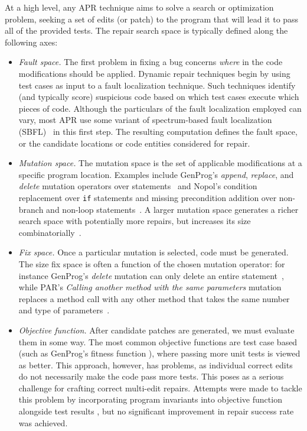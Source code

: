 \documentclass[sigconf, timestamp-false, anonymous=true]{acmart}
\begin{document}
At a high level, any APR technique aims to solve a search or optimization
problem, seeking a set of edits (or patch) to the program that will lead it to
pass all of the provided tests. The repair search space is typically defined
along the following axes:
\begin{itemize}

\item \emph{Fault space.} The first problem in fixing a bug concerns
  \emph{where} in the code modifications should be applied. Dynamic repair
  techniques begin by using test cases as input to a fault localization
  technique. Such techniques identify (and typically score) suspicious code
  based on which test cases execute which pieces of code. Although the
  particulars of the fault localization employed can vary, most APR use some
  variant of spectrum-based fault localization (SBFL)~\cite{ochiai} in this first
  step. The resulting computation defines the fault space, or the candidate
  locations or code entities considered for repair.

\item \emph{Mutation space.} The mutation space is the set of applicable
  modifications at a specific program location. Examples include GenProg's
  \emph{append}, \emph{replace}, and \emph{delete} mutation operators over
  statements~\cite{genprog-operators} and Nopol's condition replacement over
  \texttt{if} statements and missing precondition addition over non-branch and
  non-loop statements~\cite{Xuan17}.  A larger mutation space generates a richer
  search space with potentially more repairs, but increases its size
  combinatorially~\cite{long-search-spaces}.

\item \emph{Fix space.} Once a particular mutation is selected, code must be
  generated. The size fix space is often a function of the chosen mutation
  operator: for instance GenProg's \emph{delete} mutation can only delete an
  entire statement~\cite{genprog}, while PAR's \emph{Calling another method with
    the same parameters} mutation replaces a method call with any other method
  that takes the same number and type of parameters~\cite{par}.

\item \emph{Objective function.} After candidate patches are generated, we must
evaluate them in some way. The most common objective functions are test case based
(such as GenProg's fitness function \cite{genprog}), where passing more unit tests
is viewed as better. This approach, however, has problems, as individual correct edits do not
necessarily make the code pass more tests. This poses as a serious challenge for 
crafting correct multi-edit repairs. Attempts were made to tackle this problem
by incorporating program invariants into objective function alongside test results
\cite{dinglyu}, but no significant improvement in repair success rate was achieved. 

\end{itemize}
\end{document}
